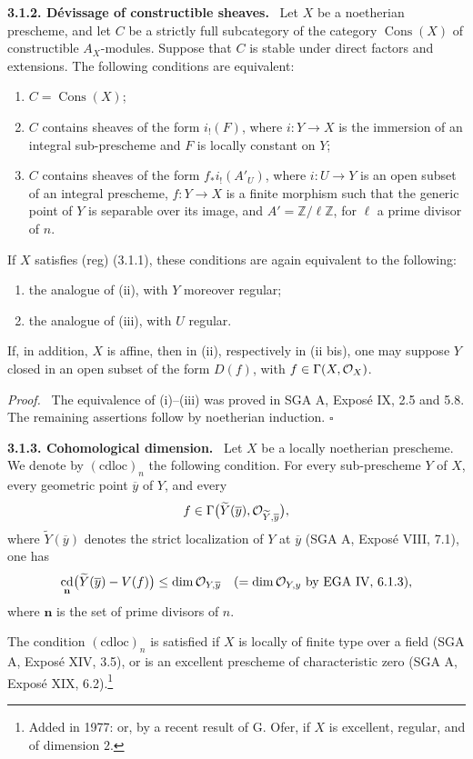 \documentclass[11pt]{article}
\theoremstyle{plain}
\theoremstyle{definition}
\theoremstyle{remark}
\newenvironment{statement}[1]{\par\medskip\noindent\textbf{#1.}\ }{\par\medskip}
\newenvironment{prooftext}{\par\noindent\textit{Proof.}\ }{\par\medskip}
\newcommand{\ZZ}{\mathbb Z}
\DeclareMathOperator{\cd}{cd}
\newcommand{\wt}[1]{\widetilde{#1}}
\newcommand{\ol}[1]{\overline{#1}}
\newcommand{\qedtext}{\hfill$\square$}
\begin{document}
\begin{statement}{3.1.2. Dévissage of constructible sheaves}
Let $X$ be a noetherian prescheme, and let $C$ be a strictly full subcategory of the category $\operatorname{Cons}(X)$ of constructible $A_X$-modules. Suppose that $C$ is stable under direct factors and extensions. The following conditions are equivalent:
\begin{enumerate}[label=(\roman*)]
\item $C=\operatorname{Cons}(X)$;
\item $C$ contains sheaves of the form $i_!(F)$, where $i:Y\to X$ is the immersion of an integral sub-prescheme and $F$ is locally constant on $Y$;
\item $C$ contains sheaves of the form $f_*i_!(A'_U)$, where $i:U\to Y$ is an open subset of an integral prescheme, $f:Y\to X$ is a finite morphism such that the generic point of $Y$ is separable over its image, and $A'=\ZZ/\ell\ZZ$, for $\ell$ a prime divisor of $n$.
\end{enumerate}
If $X$ satisfies (reg) (3.1.1), these conditions are again equivalent to the following:
\begin{enumerate}[label=(\roman* bis)]
\item the analogue of (ii), with $Y$ moreover regular;
\item the analogue of (iii), with $U$ regular.
\end{enumerate}
If, in addition, $X$ is affine, then in (ii), respectively in (ii bis), one may suppose $Y$ closed in an open subset of the form $D(f)$, with $f\in \Gamma(X,\mathcal O_X)$.
\end{statement}

\begin{prooftext}
The equivalence of (i)--(iii) was proved in SGA A, Exposé IX, 2.5 and 5.8. The remaining assertions follow by noetherian induction. \qedtext
\end{prooftext}

\begin{statement}{3.1.3. Cohomological dimension}
Let $X$ be a locally noetherian prescheme. We denote by $(\mathrm{cdloc})_n$ the following condition. For every sub-prescheme $Y$ of $X$, every geometric point $\ol y$ of $Y$, and every
\[
   f\in\Gamma\bigl(\wt Y(\ol y),\cO_{\wt Y,\ol y}\bigr),
\]
where $\wt Y(\ol y)$ denotes the strict localization of $Y$ at $\ol y$ (SGA A, Exposé VIII, 7.1), one has
\[
   \cd_{\mathbf n}\bigl(\wt Y(\ol y)-V(f)\bigr)
       \le \dim \cO_{Y,\ol y}
       \quad (=\dim \cO_{Y,y}\text{ by EGA IV, 6.1.3}),
\]
where $\mathbf n$ is the set of prime divisors of $n$.

The condition $(\mathrm{cdloc})_n$ is satisfied if $X$ is locally of finite type over a field (SGA A, Exposé XIV, 3.5), or is an excellent prescheme of characteristic zero (SGA A, Exposé XIX, 6.2).\footnote{Added in 1977: or, by a recent result of G. Ofer, if $X$ is excellent, regular, and of dimension $2$.}
\end{statement}
\end{document}
